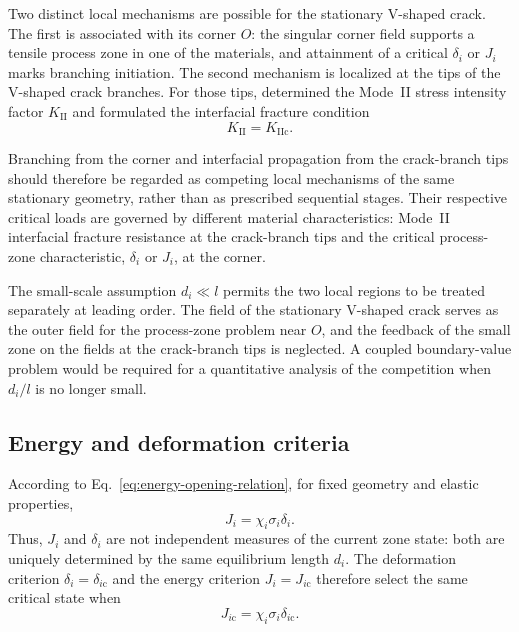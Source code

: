 \documentclass[pdflatex,iicol,sn-mathphys-ay]{sn-jnl}
\begin{document}
Two distinct local mechanisms are possible for the stationary V-shaped
crack. The first is associated with its corner $O$: the singular corner
field supports a tensile process zone in one of the materials, and
attainment of a critical $\delta_i$ or $J_i$ marks branching initiation.
The second mechanism is localized at the tips of the V-shaped crack branches.
For those tips, \citet{NazarenkoKipnis2022Equilibrium} determined the Mode~II stress
intensity factor $K_{\mathrm{II}}$ and formulated the interfacial
fracture condition
\begin{equation*}
  K_{\mathrm{II}}=K_{\mathrm{IIc}}.
\end{equation*}

Branching from the corner and interfacial propagation from the crack-branch tips
should therefore be regarded as competing local mechanisms of the same
stationary geometry, rather than as prescribed sequential stages. Their
respective critical loads are governed by different material
characteristics: Mode~II interfacial fracture resistance at the crack-branch tips
and the critical process-zone characteristic, $\delta_i$ or $J_i$, at
the corner.

The small-scale assumption $d_i\ll l$ permits the two local regions to be
treated separately at leading order. The field of the stationary V-shaped
crack serves as the outer field for the process-zone problem near $O$, and
the feedback of the small zone on the fields at the crack-branch tips is
neglected. A coupled boundary-value problem would be required for a
quantitative analysis of the competition when $d_i/l$ is no longer small.

\subsection{Energy and deformation criteria}
\label{subsec:discussion-criteria}

According to Eq.~\eqref{eq:energy-opening-relation}, for fixed geometry
and elastic properties,
\begin{equation*}
  J_i=\chi_i\sigma_i\delta_i.
\end{equation*}
Thus, $J_i$ and $\delta_i$ are not independent measures of the current
zone state: both are uniquely determined by the same equilibrium length
$d_i$. The deformation criterion
$\delta_i=\delta_{i\mathrm{c}}$ and the energy criterion
$J_i=J_{i\mathrm{c}}$ therefore select the same critical state when
\begin{equation*}
  J_{i\mathrm{c}}
  =\chi_i\sigma_i\delta_{i\mathrm{c}}.
\end{equation*}
\end{document}
